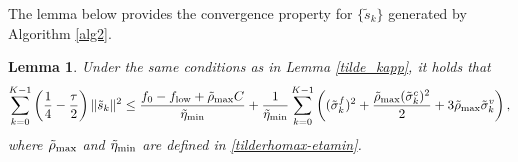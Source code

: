 \documentclass[11pt]{article}
\newtheorem{lemma}{Lemma}
\begin{document}
The lemma below  provides the convergence {property} for $\{\tilde s_k\}$ generated by  Algorithm \ref{alg2}.

\begin{lemma}\label{thm:sto-convergence}
    Under the same conditions as in Lemma \ref{tilde_kapp},  
    it holds that 
    \begin{align*}
    \sum_{k=0}^{K-1} \left(\frac{1}{4}-\frac{\tau}{2}\right) \|\tilde s_k\|^2 
    \leq  \frac{f_0-f_{\rm low}+\tilde \rho_{\rm max} C}{\tilde \eta_{\rm min} } + \frac{1}{\tilde \eta_{\min}} \sum_{k=0}^{K-1} \left((\tilde \sigma_k^f)^2 + \frac{\tilde \rho_{{\max}}(\tilde \sigma_k^c)^2}{2} + {3\tilde \rho_{{\max}} \tilde \sigma_k^v}\right),
    \end{align*}
    where \(\tilde \rho_{\rm max}\) and \(\tilde \eta_{\rm min}\) are defined in \eqref{tilderhomax-etamin}.
\end{lemma}
\end{document}
